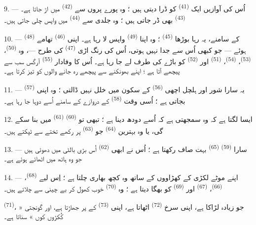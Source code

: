 9. --- اُس کی آوازیں ایک  \textsuperscript{(41)} کو ڈرا
دیتی ہیں ؛ وہ پورے پروں سے  \textsuperscript{(42)}
میں اڑ جاتا ہے۔  \textsuperscript{(43)} بھی ڈر جاتی
ہیں ؛ وہ جلدی سے  \textsuperscript{(44)} میں واپس
چلی جاتی ہیں۔

10. ---  \textsuperscript{(48)} کے سامنے، یہ رہا
بوڑھا  \textsuperscript{(45)} ؛ وہ اپنا 
\textsuperscript{(49)} واپس لا رہا ہے۔ اپنی 
\textsuperscript{(46)} تھامے ہوئے — جو کبھی اُس سے جدا نہیں ہوتی،
اُس کی رنگ اڑی  \textsuperscript{(47)} کی طرح —، وہ
 \textsuperscript{(50)}، 
\textsuperscript{(53)}،  \textsuperscript{(54)}،
 \textsuperscript{(51)} اور 
\textsuperscript{(52)} کو باڑے کی طرف لے جا رہا ہے۔ اُس کا وفادار
 \textsuperscript{(55)} آرگس سب سے پیچھے آتا ہے ؛ اپنے
بھونکنے سے پیچھے رہ جانے والوں کو تیز کرتا ہے۔

11. --- یہ سارا شور اور ہلچل اچھی 
\textsuperscript{(56)} کے سکون میں خلل نہیں ڈالتی ؛ وہ اپنی
 \textsuperscript{(57)} بجاتی ہے ؛ اُسی وقت
 \textsuperscript{(58)} کے دروازے کے سامنے اُسے دوہا جا
رہا ہے۔

12. ایسا لگتا ہے کہ وہ سمجھتی ہے کہ اُسے دودھ دینا ہے ؛ تبھی تو
 \textsuperscript{(60)} 
\textsuperscript{(61)} میں  بنا سکے گی، یا وہ بہترین
 \textsuperscript{(64)} جو 
\textsuperscript{(63)} پر رکھے تختے سے ٹپکتے ہیں۔

13. --- سارا  \textsuperscript{(59)}
 \textsuperscript{(65)} بہت صاف رکھتا ہے ؛ اُس
نے ابھی  \textsuperscript{(62)} اُس بڑی
بالٹی میں دھوئی ہیں جو وہ ہاتھ میں اٹھائے ہوئے ہے۔

\VUsaut{3.0mm}
\VUsaut{3.0mm}

14. --- اپنے موٹے لکڑی کے کھڑاووں کے ساتھ وہ کچھ بھاری چلتا ہے ؛
اِس لیے  \textsuperscript{(68)}، 
\textsuperscript{(66)}،  \textsuperscript{(67)}
اور  \textsuperscript{(69)} کو بھگا دیتا ہے ؛ وہ
 \textsuperscript{(70)} خوب کھول کر بے چینی سے
چلاتے ہیں۔

 \textsuperscript{(71)}، جو زیادہ لڑاکا ہے، اپنی سرخ
 \textsuperscript{(72)} اٹھاتا ہے، اپنی 
\textsuperscript{(73)} کے پر جھاڑتا ہے، اور گونجتی « کُکڑوں کوں »
سناتا ہے۔

